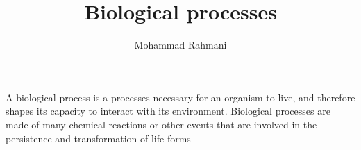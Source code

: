 \documentclass[a4paper]{article}
\title{Biological processes}
\date{}
\author{Mohammad Rahmani}
\begin{document}
    \maketitle
    A biological process is a processes necessary for an organism to live, and therefore shapes its capacity to interact with its environment. Biological processes are made of many chemical reactions or other events that are involved in the persistence and transformation of life forms
\end{document}
